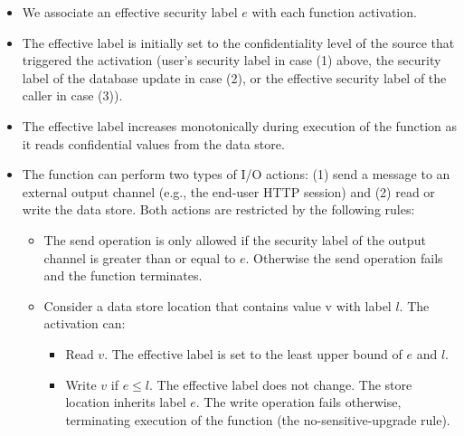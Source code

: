 \documentclass[acmsmall,10pt,review,anonymous]{acmart}\settopmatter{printfolios=true}
\begin{document}
\begin{itemize}
    \item We associate an effective security label $e$ with each 
        function activation.

    \item The effective label is initially set to the confidentiality 
        level of the source that triggered the activation (user's 
        security label in case (1) above, the security label of the 
        database update in case (2), or the effective security label 
        of the caller in case (3)).

    \item The effective label increases monotonically during execution 
        of the function as it reads confidential values from the data 
        store.

    \item The function can perform two types of I/O actions: (1) send 
        a message to an external output channel (e.g., the end-user 
        HTTP session) and (2) read or write the data store.  Both 
        actions are restricted by the following rules:

        \begin{itemize}
            \item The send operation is only allowed if the security 
                label of the output channel is greater than or equal 
                to $e$. Otherwise the send operation fails and the 
                function terminates.

            \item Consider a data store location that contains value v 
                with label $l$.  The activation can:
                \begin{itemize}
                    \item Read $v$. The effective label is set to the 
                        least upper bound of $e$ and $l$.

                    \item Write $v$ if $e \leq l$. The effective label 
                        does not change. The store location inherits 
                        label $e$.  The write operation fails 
                        otherwise, terminating execution of the 
                        function (the no-sensitive-upgrade rule).
                \end{itemize}
        \end{itemize}
\end{itemize}
\end{document}
